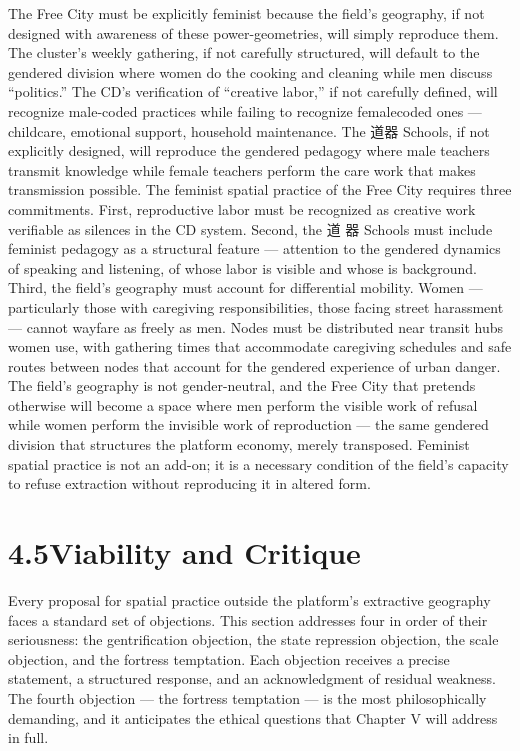 The Free City must be explicitly feminist because the field’s geography, if not designed with awareness of these power-geometries, will simply reproduce them. The cluster’s weekly gathering, if not carefully structured, will default to the gendered division where women do the cooking and cleaning while men discuss “politics.” The CD’s verification of “creative labor,” if not carefully defined, will recognize male-coded practices while failing to recognize femalecoded ones — childcare, emotional support, household maintenance. The 道器 Schools, if not explicitly designed, will reproduce the gendered pedagogy where male teachers transmit knowledge while female teachers perform the care work that makes transmission possible. The feminist spatial practice of the Free City requires three commitments. First, reproductive labor must be recognized as creative work verifiable as silences in the CD system. Second, the 道 器 Schools must include feminist pedagogy as a structural feature — attention to the gendered dynamics of speaking and listening, of whose labor is visible and whose is background. Third, the field’s geography must account for differential mobility. Women — particularly those with caregiving responsibilities, those facing street harassment — cannot wayfare as freely as men. Nodes must be distributed near transit hubs women use, with gathering times that accommodate caregiving schedules and safe routes between nodes that account for the gendered experience of urban danger. The field’s geography is not gender-neutral, and the Free City that pretends otherwise will become a space where men perform the visible work of refusal while women perform the invisible work of reproduction — the same gendered division that structures the platform economy, merely transposed. Feminist spatial practice is not an add-on; it is a necessary condition of the field’s capacity to refuse extraction without reproducing it in altered form.

\section{4.5\quad Viability and Critique}

Every proposal for spatial practice outside the platform’s extractive geography faces a standard set of objections. This section addresses four in order of their seriousness: the gentrification objection, the state repression objection, the scale objection, and the fortress temptation. Each objection receives a precise statement, a structured response, and an acknowledgment of residual weakness. The fourth objection — the fortress temptation — is the most philosophically demanding, and it anticipates the ethical questions that Chapter V will address in full.


